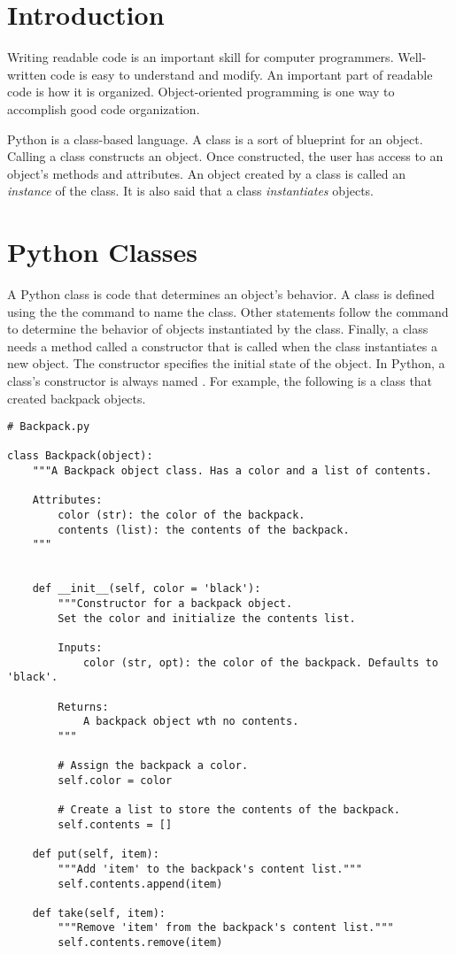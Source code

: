 \label{lab:OOP}

\section*{Introduction}

Writing readable code is an important skill for computer programmers.
Well-written code is easy to understand and modify.
An important part of readable code is how it is organized.
Object-oriented programming is one way to accomplish good code organization.

Python is a class-based language.
A class is a sort of blueprint for an object.
Calling a class constructs an object.
Once constructed, the user has access to an object's methods and attributes.
An object created by a class is called an \emph{instance} of the class.
It is also said that a class \emph{instantiates} objects.

\section*{Python Classes}

A Python class is code that determines an object's behavior.
A class is defined using the the  command to name the class.
Other statements follow the  command to determine the behavior of objects instantiated by the class.
Finally, a class needs a method called a constructor that is called when the class instantiates a new object.
The constructor specifies the initial state of the object.
In Python, a class's constructor is always named .
For example, the following is a class that created backpack objects.

\begin{lstlisting}
# Backpack.py

class Backpack(object):
    """A Backpack object class. Has a color and a list of contents.
    
    Attributes:
        color (str): the color of the backpack.
        contents (list): the contents of the backpack.
    """
    
    
    def __init__(self, color = 'black'):
        """Constructor for a backpack object.
		Set the color and initialize the contents list.
        
        Inputs:
            color (str, opt): the color of the backpack. Defaults to 'black'.
        
        Returns:
            A backpack object wth no contents.
        """
        
        # Assign the backpack a color.
        self.color = color
        
        # Create a list to store the contents of the backpack.
        self.contents = []
    
    def put(self, item):
        """Add 'item' to the backpack's content list."""
        self.contents.append(item)
    
    def take(self, item):
        """Remove 'item' from the backpack's content list."""
        self.contents.remove(item)
\end{lstlisting}

